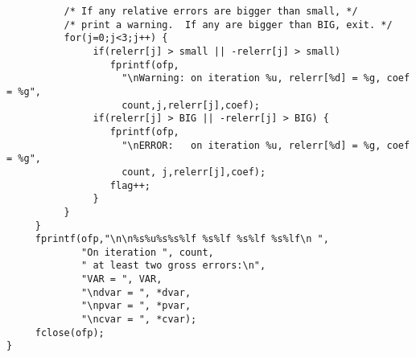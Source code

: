 \documentclass{article}
\begin{document}
{\begin{verbatim}
          /* If any relative errors are bigger than small, */
          /* print a warning.  If any are bigger than BIG, exit. */
          for(j=0;j<3;j++) {
               if(relerr[j] > small || -relerr[j] > small) 
                  fprintf(ofp,
                    "\nWarning: on iteration %u, relerr[%d] = %g, coef = %g",
                    count,j,relerr[j],coef);
               if(relerr[j] > BIG || -relerr[j] > BIG) {
                  fprintf(ofp,
                    "\nERROR:   on iteration %u, relerr[%d] = %g, coef = %g",
                    count, j,relerr[j],coef);
                  flag++;
               }
          }
     }
     fprintf(ofp,"\n\n%s%u%s%s%lf %s%lf %s%lf %s%lf\n ",
             "On iteration ", count,
             " at least two gross errors:\n",
             "VAR = ", VAR,
             "\ndvar = ", *dvar, 
             "\npvar = ", *pvar, 
             "\ncvar = ", *cvar);
     fclose(ofp);
}
\end{verbatim}
}
\end{document}
